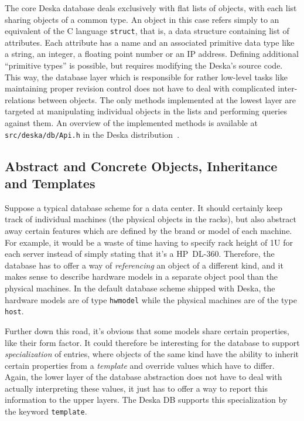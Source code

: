 \documentclass[a4paper]{jpconf}
\begin{document}
The core Deska database deals exclusively with flat lists of objects, with each list sharing objects of a common type.  An object in this case refers simply to an
equivalent of the C language {\tt struct}, that is, a data structure containing list of attributes.  Each attribute has a name and an
associated primitive data type like a string, an integer, a floating point number or an IP address.  Defining additional ``primitive
types'' is possible, but requires modifying the Deska's source code.  This way, the database layer which is responsible for rather
low-level tasks like maintaining proper revision control does not have to deal with complicated inter-relations between objects.  The
only methods implemented at the lowest layer are targeted at manipulating individual objects in the lists and performing queries against
them.  An overview of the implemented methods is available at {\tt src/deska/db/Api.h} in the Deska distribution~\cite{deska-project}.

\subsection{Abstract and Concrete Objects, Inheritance and Templates}

Suppose a typical database scheme for a data center.  It should certainly keep track of individual machines (the physical objects in
the racks), but also abstract away certain features which are defined by the brand or model of each machine.  For example, it would be
a waste of time having to specify rack height of 1U for each server instead of simply stating that it's a HP~DL-360.  Therefore, the
database has to offer a way of {\em referencing} an object of a different kind, and it makes sense to describe hardware models in a
separate object pool than the physical machines.  In the default database scheme shipped with Deska, the hardware models are of type
{\tt hwmodel} while the physical machines are of the type {\tt host}.

Further down this road, it's obvious that some models share certain properties, like their form factor.  It could therefore be
interesting for the database to support {\em specialization} of entries, where objects of the same kind have the ability to inherit
certain properties from a {\em template} and override values which have to differ.  Again, the lower layer of the database abstraction
does not have to deal with actually interpreting these values, it just has to offer a way to report this information to the upper
layers.  The Deska DB supports this specialization by the keyword {\tt template}.
\end{document}
